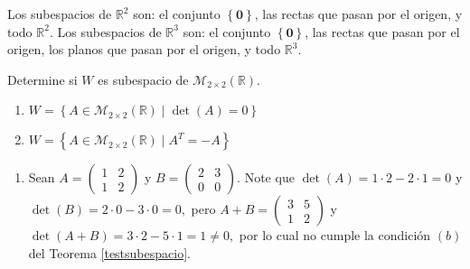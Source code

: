 \begin{rem}
Los subespacios de $\mathbb{R}^2$ son: el conjunto $\left\lbrace \mathbf{0} \right\rbrace$, las rectas que pasan por el origen, y todo $\mathbb{R}^2$. Los subespacios de $\mathbb{R}^3$ son: el conjunto $\left\lbrace \mathbf{0} \right\rbrace$, las rectas que pasan por el origen, los planos que pasan por el origen, y todo $\mathbb{R}^3$.
\end{rem}

\begin{example} Determine si $W$ es subespacio de $\mathcal{M}_{2\times 2}\left(\mathbb{R}\right).$
\begin{multicols}{2}
\begin{enumerate}[$(a)$]
\item $W=\left\lbrace A\in\mathcal{M}_{2\times 2}\left(\mathbb{R}\right) \mid \det(A)=0   \right\rbrace$
\item $W=\left\lbrace A\in\mathcal{M}_{2\times 2}\left(\mathbb{R}\right) \mid  A^T=-A  \right\rbrace$
\end{enumerate}
\end{multicols}
\begin{myproof} \begin{enumerate}[$(a)$]
\item Sean $A=\begin{pmatrix} 1&2\\1&2 \end{pmatrix}$ y $B=\begin{pmatrix}2&3\\0&0 \end{pmatrix}.$ Note que $\det(A)=1\cdot 2-2\cdot 1=0$ y $\det(B)=2\cdot 0-3\cdot 0=0,$ pero $A+B=\begin{pmatrix} 3&5\\1&2 \end{pmatrix}$ y $\det(A+B)=3\cdot 2-5\cdot 1=1\neq 0,$ por lo cual no cumple la condición $(b)$ del Teorema \ref{testsubespacio}.

\end{enumerate}
\end{myproof}
\end{example}
